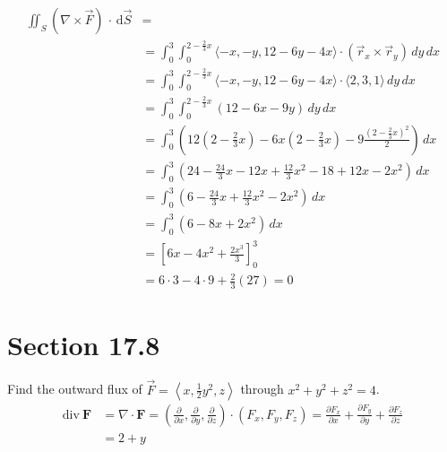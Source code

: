 \documentclass[letter,11pt]{article}
\begin{document}
\begin{align*}
    \iint_{S}\left(\nabla \times \vec{F}\right)\, \cdot\, \mathrm{d}\vec{S}&=\\
    &= \int_{0}^{3} \int_{0}^{2-\frac{2}{3}x} \langle -x, -y, 12-6y-4x \rangle \cdot \left(\vec{r}_{x}\times \vec{r}_{y}\right) \, dy\, dx\\
    &= \int_{0}^{3} \int_{0}^{2-\frac{2}{3}x} \langle -x, -y, 12-6y-4x \rangle \cdot \langle 2,3,1\rangle \, dy\, dx\\
    &= \int_{0}^{3} \int_{0}^{2-\frac{2}{3}x} \left(12-6x-9y\right) \, dy\, dx\\
    &= \int_{0}^{3}\left(12\left(2-\frac{2}{3}x\right)-6x\left(2-\frac{2}{3}x\right)-9\frac{\left(2-\frac{2}{3}x\right)^{2}}{2}\right)\, dx\\
    &= \int_{0}^{3}\left(24-\frac{24}{3}x-12x+\frac{12}{3}x^{2}-18+12x-2x^{2}\right)\,dx\\
    &= \int_{0}^{3}\left(6-\frac{24}{3}x+\frac{12}{3}x^{2}-2x^{2}\right)\,dx\\
    &= \int_{0}^{3}\left(6-8x+2x^{2}\right)\,dx\\
    &= \left[6x-4x^{2}+\frac{2x^{3}}{3}\right]_{0}^3\\
    &= 6\cdot3-4\cdot9+\frac{2}{3}\left(27\right) = \boxed{0}
\end{align*}

\section*{Section 17.8} 
Find the outward flux of $\vec{F}=\left\langle x, \frac{1}{2} y^{2}, z\right\rangle$ through $x^{2}+y^{2}+z^{2}=4$.
\begin{align*}
    \mathrm{div}~\mathbf{F} &= \nabla\cdot\mathbf{F} = \left(\frac{\partial}{\partial x}, \frac{\partial}{\partial y}, \frac{\partial}{\partial z} \right) \cdot (F_x,F_y,F_z) = \frac{\partial F_x}{\partial x}+\frac{\partial F_y}{\partial y}+\frac{\partial F_z}{\partial z}\\
    &= 2+y
\end{align*}
\end{document}
